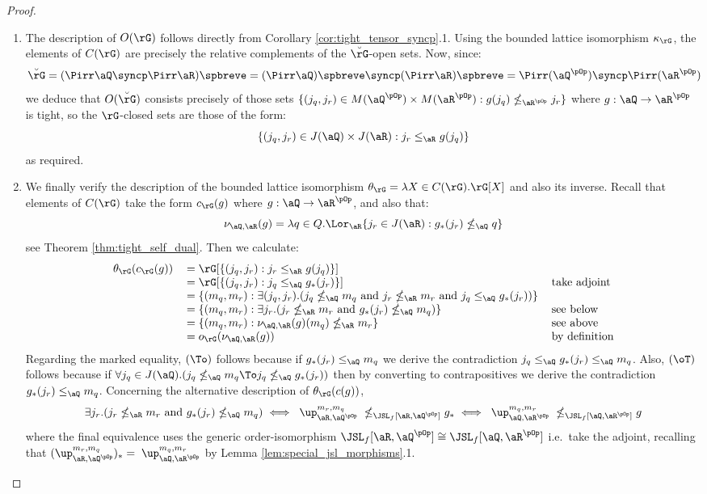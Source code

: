 \documentclass{article}
\begin{document}
\begin{proof}
\item
\begin{enumerate}
\item
The description of $O(\rG)$ follows directly from Corollary \ref{cor:tight_tensor_syncp}.1. Using the bounded lattice isomorphism $\kappa_\rG$, the elements of $C(\rG)$ are precisely the relative complements of the $\breve{\rG}$-open sets. Now, since:
\[
\breve{\rG} 
= (\Pirr\aQ \syncp \Pirr\aR)\spbreve
= (\Pirr\aQ)\spbreve \syncp (\Pirr\aR)\spbreve
= \Pirr(\aQ^{\pOp}) \syncp \Pirr(\aR^{\pOp})
\]
we deduce that $O(\breve{\rG})$ consists precisely of those sets $\{ (j_q,j_r) \in M(\aQ^{\pOp}) \times M(\aR^{\pOp}) : g(j_q) \nleq_{\aR^{\pOp}} j_r \}$ where $g : \aQ \to \aR^{\pOp}$ is tight, so the $\rG$-closed sets are those of the form:
\[
\{(j_q,j_r) \in J(\aQ) \times J(\aR) : j_r \leq_\aR g(j_q) \}
\]
as required.


\item
We finally verify the description of the bounded lattice isomorphism $\theta_\rG = \lambda X \in C(\rG).\rG[X]$ and also its inverse. Recall that elements of $C(\rG)$ take the form $c_\rG(g)$ where $g : \aQ \to \aR^{\pOp}$, and also that:
\[
\nu_{\aQ,\aR}(g) = \lambda q \in Q.\Lor_\aR \{ j_r \in J(\aR) : g_*(j_r) \nleq_\aQ q \}
\]
see Theorem \ref{thm:tight_self_dual}. Then we calculate:
\[
\begin{tabular}{lll}
$\theta_\rG(c_\rG(g))$
&
$= \rG[\{ (j_q,j_r) : j_r \leq_\aR g(j_q) \}]$
\\&
$= \rG[\{ (j_q,j_r) : j_q \leq_\aQ g_*(j_r) \}]$
& take adjoint
\\&
$= \{ (m_q,m_r) : \exists (j_q,j_r).( j_q \nleq_\aQ m_q \text{ and } j_r \nleq_\aR m_r \text{ and } j_q \leq_\aQ g_*(j_r)   )\}$
\\&
$= \{ (m_q,m_r) : \exists j_r.( j_r \nleq_\aR m_r \text{ and } g_*(j_r) \nleq_\aQ m_q ) \}$
& see below
\\&
$= \{ (m_q,m_r) : \nu_{\aQ,\aR}(g)(m_q) \nleq_\aR m_r \}$
& see above
\\&
$= o_\rG(\nu_{\aQ,\aR}(g))$
& by definition
\end{tabular}
\]
Regarding the marked equality, $(\To)$ follows because if $g_*(j_r) \leq_\aQ m_q$ we derive the contradiction $j_q \leq_\aQ g_*(j_r) \leq_\aQ m_q$. Also, $(\oT)$ follows because if $\forall j_q \in J(\aQ).(j_q \nleq_\aQ m_q \To j_q \nleq_\aQ g_*(j_r))$ then by converting to contrapositives we derive the contradiction $g_*(j_r) \leq_\aQ m_q$. Concerning the alternative description of $\theta_\rG(c(g))$,
\[
\exists j_r.( j_r \nleq_\aR m_r \text{ and } g_*(j_r) \nleq_\aQ m_q )
\iff
\; \up_{\aR,\aQ^{\pOp}}^{m_r,m_q}  \; \nleq_{\JSL_f[\aR,\aQ^{\pOp}]} g_*
\iff
\; \up_{\aQ,\aR^{\pOp}}^{m_q,m_r}  \; \nleq_{\JSL_f[\aQ,\aR^{\pOp}]} g 
\]
where the final equivalence uses the generic order-isomorphism $\JSL_f[\aR,\aQ^{\pOp}] \cong \JSL_f[\aQ,\aR^{\pOp}]$ i.e.\ take the adjoint, recalling that $(\up_{\aR,\aQ^{\pOp}}^{m_r,m_q})_* = \; \up_{\aQ,\aR^{\pOp}}^{m_q,m_r}$ by Lemma \ref{lem:special_jsl_morphisms}.1.


\end{enumerate}
\end{proof}
\end{document}
